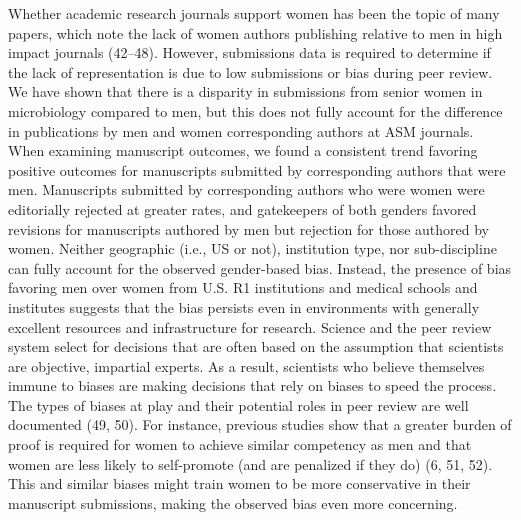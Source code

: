 \documentclass[11pt,]{article}
\begin{document}
Whether academic research journals support women has been the topic of
many papers, which note the lack of women authors publishing relative to
men in high impact journals (42--48). However, submissions data is
required to determine if the lack of representation is due to low
submissions or bias during peer review. We have shown that there is a
disparity in submissions from senior women in microbiology compared to
men, but this does not fully account for the difference in publications
by men and women corresponding authors at ASM journals. When examining
manuscript outcomes, we found a consistent trend favoring positive
outcomes for manuscripts submitted by corresponding authors that were
men. Manuscripts submitted by corresponding authors who were women were
editorially rejected at greater rates, and gatekeepers of both genders
favored revisions for manuscripts authored by men but rejection for
those authored by women. Neither geographic (i.e., US or not),
institution type, nor sub-discipline can fully account for the observed
gender-based bias. Instead, the presence of bias favoring men over women
from U.S. R1 institutions and medical schools and institutes suggests
that the bias persists even in environments with generally excellent
resources and infrastructure for research. Science and the peer review
system select for decisions that are often based on the assumption that
scientists are objective, impartial experts. As a result, scientists who
believe themselves immune to biases are making decisions that rely on
biases to speed the process. The types of biases at play and their
potential roles in peer review are well documented (49, 50). For
instance, previous studies show that a greater burden of proof is
required for women to achieve similar competency as men and that women
are less likely to self-promote (and are penalized if they do) (6, 51,
52). This and similar biases might train women to be more conservative
in their manuscript submissions, making the observed bias even more
concerning.
\end{document}
